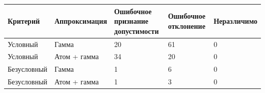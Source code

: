 \begin{tabular}{p{.17\linewidth}p{.21\linewidth}p{.17\linewidth}p{.15\linewidth}p{.16\linewidth}}
\hline
Критерий & Аппроксимация & Ошибочное признание допустимости & Ошибочное отклонение & Неразличимо \\
\hline
Условный & Гамма & 20 & 61 & 0 \\
Условный & Атом + гамма & 34 & 20 & 0 \\
Безусловный & Гамма & 1 & 6 & 0 \\
Безусловный & Атом + гамма & 1 & 3 & 0 \\
\hline
\end{tabular}
